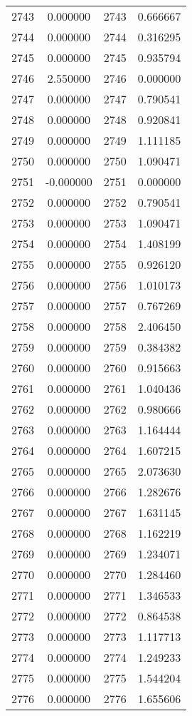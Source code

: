 \documentclass[12pt]{article}
\begin{document}
\begin{longtable}{@{}cccc@{}}
2743 & 0.000000 & 2743 & 0.666667 \\
2744 & 0.000000 & 2744 & 0.316295 \\
2745 & 0.000000 & 2745 & 0.935794 \\
2746 & 2.550000 & 2746 & 0.000000 \\
2747 & 0.000000 & 2747 & 0.790541 \\
2748 & 0.000000 & 2748 & 0.920841 \\
2749 & 0.000000 & 2749 & 1.111185 \\
2750 & 0.000000 & 2750 & 1.090471 \\
2751 & -0.000000 & 2751 & 0.000000 \\
2752 & 0.000000 & 2752 & 0.790541 \\
2753 & 0.000000 & 2753 & 1.090471 \\
2754 & 0.000000 & 2754 & 1.408199 \\
2755 & 0.000000 & 2755 & 0.926120 \\
2756 & 0.000000 & 2756 & 1.010173 \\
2757 & 0.000000 & 2757 & 0.767269 \\
2758 & 0.000000 & 2758 & 2.406450 \\
2759 & 0.000000 & 2759 & 0.384382 \\
2760 & 0.000000 & 2760 & 0.915663 \\
2761 & 0.000000 & 2761 & 1.040436 \\
2762 & 0.000000 & 2762 & 0.980666 \\
2763 & 0.000000 & 2763 & 1.164444 \\
2764 & 0.000000 & 2764 & 1.607215 \\
2765 & 0.000000 & 2765 & 2.073630 \\
2766 & 0.000000 & 2766 & 1.282676 \\
2767 & 0.000000 & 2767 & 1.631145 \\
2768 & 0.000000 & 2768 & 1.162219 \\
2769 & 0.000000 & 2769 & 1.234071 \\
2770 & 0.000000 & 2770 & 1.284460 \\
2771 & 0.000000 & 2771 & 1.346533 \\
2772 & 0.000000 & 2772 & 0.864538 \\
2773 & 0.000000 & 2773 & 1.117713 \\
2774 & 0.000000 & 2774 & 1.249233 \\
2775 & 0.000000 & 2775 & 1.544204 \\
2776 & 0.000000 & 2776 & 1.655606 \\

\end{longtable}
\end{document}
